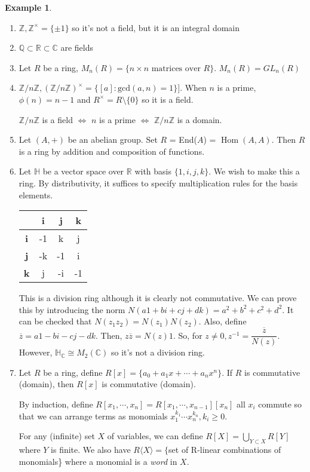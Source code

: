 \documentclass{article}
\newcommand\R{\ensuremath{\mathbb{R}}}
\newcommand\Z{\ensuremath{\mathbb{Z}}}
\newcommand\Q{\ensuremath{\mathbb{Q}}}
\newcommand\C{\ensuremath{\mathbb{C}}}
\newcommand\Ha{\ensuremath{\mathbb{H}}}
\DeclareMathOperator{\Hom}{Hom}
\theoremstyle{definition}
\newtheorem{eg}{Example}[subsection]
\theoremstyle{remark}
\theoremstyle{plain}
\begin{document}
\begin{eg}
    \begin{enumerate}
        \item $\Z, \Z^{\times} = \{\pm 1\}$ so it's not a field, but it is an integral domain
        \item $\Q \subset \R \subset \C$ are fields
        \item Let $R$ be a ring, $M_n(R) = \{n\times n \text{ matrices over } R \}$. $M_n(R) = GL_n(R)$
        \item $\Z/n\Z, (\Z/n\Z)^{\times} = \{[a]:\mathrm{gcd}(a,n) =1\}]$. When $n$ is a prime, $\phi(n) = n-1$ and $R^{\times} = R\setminus\{0\}$ so it is a field. 

        $\Z/n\Z$ is a field $\iff$ $n$ is a prime $\iff$ $\Z/n\Z$ is a domain. 
        \item Let $(A,+)$ be an abelian group. Set $R$ = End($A$) = $\Hom(A,A)$. Then $R$ is a ring by addition and composition of functions. 
        \item Let $\Ha$ be a vector space over $\R$ with basis $\{1,i,j,k\}$. We wish to make this a ring. By distributivity, it suffices to specify multiplication rules for the basis elements.
        
        \begin{table}[h]
            \centering
            \begin{tabular}{|c|c|c|c|}
            \hline
                       & \textbf{i} & \textbf{j} & \textbf{k} \\ \hline
            \textbf{i} & -1         & k          & j          \\ \hline
            \textbf{j} & -k         & -1         & i          \\ \hline
            \textbf{k} & j          & -i         & -1         \\ \hline
            \end{tabular}
        \end{table}

This is a division ring although it is clearly not commutative. We can prove this by introducing the norm $N(a1 + bi + cj + dk) = a^2 + b^2 + c^2 + d^2$. It can be checked that $N(z_1z_2) = N(z_1)N(z_2)$. Also, define $\overline{z} = a1 - bi - cj - dk$. Then, $z\overline{z} = N(z)1$. So, for $z \neq 0, z^{-1} = \dfrac{\overline{z}}{N(z)}$. However, $\Ha_{\C} \cong M_2(\C)$ so it's not a division ring. 

\item Let $R$ be a ring, define $R[x] = \{a_0 + a_1x + \cdots + a_nx^n \}$. If $R$ is commutative (domain), then $R[x]$ is commutative (domain). 

By induction, define $R[x_1,\cdots, x_n] = R[x_1, \cdots, x_{n-1}][x_n]$ all $x_i$ commute so that we can arrange terms as monomials $x_1^{k_1}\cdots x_n^{k_n}, k_i \geq 0$.

For any (infinite) set $X$ of variables, we can define $R[X] = \bigcup\limits_{Y \subset X} R[Y]$ where $Y$ is finite. We also have $R\langle X\rangle = \{$set of R-linear combinations of monomials\} where a monomial is a \textit{word} in $X$. 

    \end{enumerate}
\end{eg}
\end{document}
